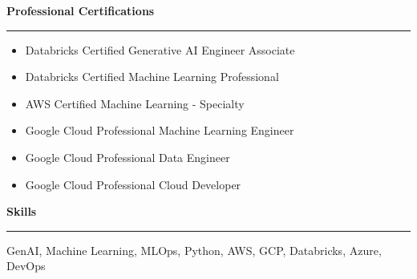 \documentclass[a4paper,10pt]{article}
\begin{document}
\vspace{0.1em}

\begin{center}
    \textbf{\large Professional Certifications} \\
    \rule{\textwidth}{0.1pt}
\end{center}
\begin{itemize}[leftmargin=0.15in, itemsep=1pt]
\item Databricks Certified Generative AI Engineer Associate
\item Databricks Certified Machine Learning Professional
\item AWS Certified Machine Learning - Specialty
\item Google Cloud Professional Machine Learning Engineer
\item Google Cloud Professional Data Engineer
\item Google Cloud Professional Cloud Developer
\end{itemize} 


\vspace{0.1em}

\begin{center}
    \textbf{\large Skills} \\
    \rule{\textwidth}{0.1pt}
\end{center}
GenAI, Machine Learning, MLOps, Python, AWS, GCP, Databricks, Azure, DevOps

\vspace{0.1em}


\end{document}
